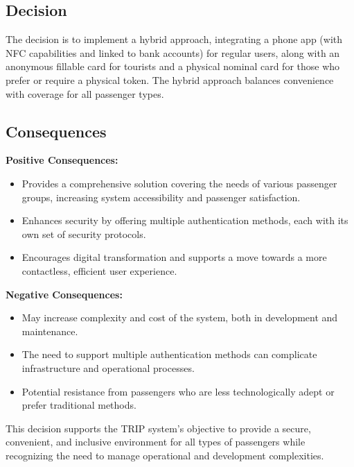 \subsection*{Decision}
The decision is to implement a hybrid approach, integrating a phone app (with NFC capabilities and linked to bank accounts) for regular users, along with an anonymous fillable card for tourists and a physical nominal card for those who prefer or require a physical token. The hybrid approach balances convenience with coverage for all passenger types.

\subsection*{Consequences}
\textbf{Positive Consequences:}
\begin{itemize}
    \item Provides a comprehensive solution covering the needs of various passenger groups, increasing system accessibility and passenger satisfaction.
    \item Enhances security by offering multiple authentication methods, each with its own set of security protocols.
    \item Encourages digital transformation and supports a move towards a more contactless, efficient user experience.
\end{itemize}
\textbf{Negative Consequences:}
\begin{itemize}
    \item May increase complexity and cost of the system, both in development and maintenance.
    \item The need to support multiple authentication methods can complicate infrastructure and operational processes.
    \item Potential resistance from passengers who are less technologically adept or prefer traditional methods.
\end{itemize}
This decision supports the TRIP system's objective to provide a secure, convenient, and inclusive environment for all types of passengers while recognizing the need to manage operational and development complexities.
